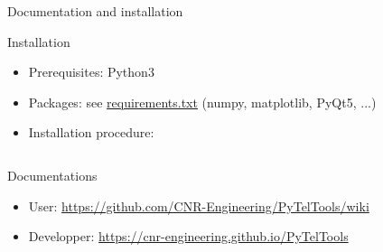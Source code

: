 

\begin{frame}{Documentation and installation}

  \begin{block}{Installation}
    \begin{itemize}
      \item Prerequisites: Python3
      \item Packages: see \href{https://github.com/CNR-Engineering/PyTelTools/blob/master/requirements.txt}{requirements.txt}  (numpy, matplotlib, PyQt5, ...)
      \item Installation procedure:
    \end{itemize}

    \inputminted[fontsize=\tiny,xleftmargin=1.5cm]{bash}{installation.sh}

  \end{block}

  \begin{block}{Documentations}
    \begin{itemize}
      \item User: \url{https://github.com/CNR-Engineering/PyTelTools/wiki}
      \item Developper: \url{https://cnr-engineering.github.io/PyTelTools}
    \end{itemize}
  \end{block}

\end{frame}




